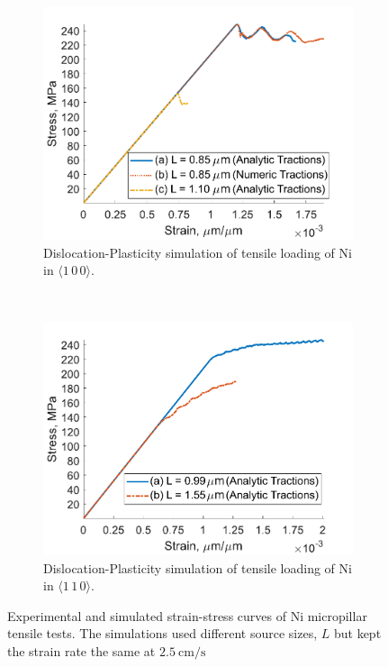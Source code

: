 \begin{figure}
    \begin{subfigure}[t]{0.45\linewidth}
        \centering
        \includegraphics[width=\linewidth]{../data/Ni100_DDD.pdf}
        \caption[Dislocation-Plasticity simulation of tensile loading of Ni in $\langle 1\, 0\, 0 \rangle$.]{Dislocation-Plasticity simulation of tensile loading of Ni in $\langle 1\, 0\, 0 \rangle$.}
        \label{sf:Ni100_DDD}
    \end{subfigure}
    ~
    \begin{subfigure}[t]{0.45\linewidth}
        \centering
        \includegraphics[width=\linewidth]{../data/Ni110_DDD.pdf}
        \caption[Dislocation-Plasticity simulation of tensile loading of Ni in $\langle 1\, 1\, 0 \rangle$.]{Dislocation-Plasticity simulation of tensile loading of Ni  in $\langle 1\, 1\, 0 \rangle$.}
        \label{sf:Ni110_DDD}
    \end{subfigure}
    \caption{Experimental and simulated strain-stress curves of Ni micropillar tensile tests. The simulations used different source sizes, $L$ but kept the strain rate the same at $\SI{2.5}{\centi\metre\per\second}$}
    \label{f:NiStrainStress}
\end{figure}

